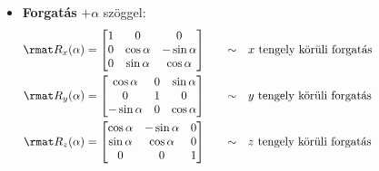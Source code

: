 \documentclass[a4paper, 12pt]{scrartcl}
\begin{document}
\begin{blueBox}
\begin{itemize}
\begin{multicols}{3}
            $$
              \rmat T_{z} = \begin{bmatrix}
                1 & 0 & 0       \\
                0 & 1 & 0       \\
                0 & 0 & \lambda
              \end{bmatrix}
              \phantom{= \rmat T_{z}}
            $$
            $z$ irányba
          \end{multicols}
          \vspace{-3mm}

    \item \textbf{Forgatás} $+\alpha$ szöggel:
          \begin{alignat*}{9}
            \rmat R_{x}(\alpha)
             & = \begin{bmatrix}
                   1 & 0           & 0            \\
                   0 & \cos \alpha & -\sin \alpha \\
                   0 & \sin \alpha & \cos \alpha
                 \end{bmatrix}
             & \quad \sim \quad
             & \text{$x$ tengely körüli forgatás} \hspace{3.25cm}
            \\
            \rmat R_{y}(\alpha)
             & = \begin{bmatrix}
                   \cos \alpha  & 0 & \sin \alpha \\
                   0            & 1 & 0           \\
                   -\sin \alpha & 0 & \cos \alpha
                 \end{bmatrix}
             & \quad \sim \quad
             & \text{$y$ tengely körüli forgatás}
            \\
            \rmat R_{z}(\alpha)
             & = \begin{bmatrix}
                   \cos \alpha & -\sin \alpha & 0 \\
                   \sin \alpha & \cos \alpha  & 0 \\
                   0           & 0            & 1
                 \end{bmatrix}
             & \quad \sim \quad
             & \text{$z$ tengely körüli forgatás}
          \end{alignat*}
  \end{itemize}
\end{blueBox}
\end{document}
